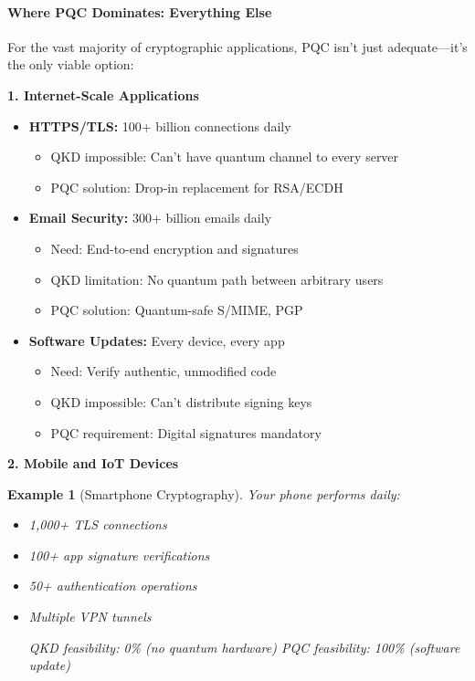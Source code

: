 \documentclass[11pt,a4paper]{article}
\newtheorem{example}{Example}
\begin{document}
\paragraph{Where PQC Dominates: Everything Else}

For the vast majority of cryptographic applications, PQC isn't just adequate---it's the only viable option:

\textbf{1. Internet-Scale Applications}

\begin{itemize}
    \item \textbf{HTTPS/TLS:} 100+ billion connections daily
    \begin{itemize}
        \item QKD impossible: Can't have quantum channel to every server
        \item PQC solution: Drop-in replacement for RSA/ECDH
    \end{itemize}
    
    \item \textbf{Email Security:} 300+ billion emails daily
    \begin{itemize}
        \item Need: End-to-end encryption and signatures
        \item QKD limitation: No quantum path between arbitrary users
        \item PQC solution: Quantum-safe S/MIME, PGP
    \end{itemize}
    
    \item \textbf{Software Updates:} Every device, every app
    \begin{itemize}
        \item Need: Verify authentic, unmodified code
        \item QKD impossible: Can't distribute signing keys
        \item PQC requirement: Digital signatures mandatory
    \end{itemize}
\end{itemize}

\textbf{2. Mobile and IoT Devices}

\begin{example}[Smartphone Cryptography]
Your phone performs daily:
\begin{itemize}
    \item 1,000+ TLS connections
    \item 100+ app signature verifications  
    \item 50+ authentication operations
    \item Multiple VPN tunnels
    
    QKD feasibility: 0\% (no quantum hardware)
    PQC feasibility: 100\% (software update)
\end{itemize}
\end{example}
\end{document}
